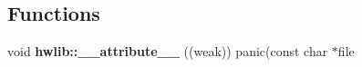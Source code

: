 \subsection*{Functions}
\begin{DoxyCompactItemize}
\item 
void {\bfseries hwlib\+::\+\_\+\+\_\+attribute\+\_\+\+\_\+} ((weak)) panic(const char $\ast$file\hypertarget{namespacehwlib_a6a24122eb10e075b9bb82755a2ecd525}{}\label{namespacehwlib_a6a24122eb10e075b9bb82755a2ecd525}

\end{DoxyCompactItemize}
